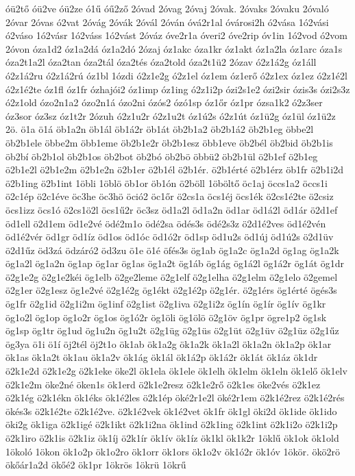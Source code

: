 {óü2tő
óü2ve
óü2ze
ó1ű
óű2ző
2óvad
2óvag
2óvaj
2óvak.
2óvaks
2óvaku
2óvaló
2óvar
2óvas
ó2vat
2óvág
2óvák
2óvál
2óván
óvá2r1al
óvárosi2h
ó2vása
1ó2vási
ó2váso
1ó2vásr
1ó2váss
1ó2vást
2óváz
óve2r1a
óveri2
óve2rip
óv1in
1ó2vod
ó2vom
2óvon
óza1d2
óz1a2dá
óz1a2dó
2ózaj
óz1akc
óza1kr
óz1akt
óz1a2la
óz1arc
óza1s
óza2t1a2l
óza2tan
óza2tál
óza2tés
óza2told
óza2t1ü2
2ózav
ó2z1á2g
óz1áll
ó2z1á2ru
ó2z1á2rú
óz1bl
1ózdi
ó2z1e2g
ó2z1el
óz1em
óz1erő
ó2z1ex
óz1ez
ó2z1é2l
ó2z1é2te
óz1fl
óz1fr
ózhajói2
óz1imp
óz1ing
ó2z1i2p
ózi2s1e2
ózi2sir
ózis3s
ózi2s3z
ó2z1old
ózo2n1a2
ózo2n1á
ózo2ni
ózós2
ózó1sp
óz1őr
óz1pr
ózsa1k2
ó2z3ser
óz3sor
óz3sz
óz1t2r
2ózuh
ó2z1u2r
ó2z1u2t
óz1ú2s
ó2z1út
óz1ü2g
óz1ül
óz1ü2z
2ö.
ö1a
ö1á
öb1a2n
öb1ál
öb1á2r
öb1át
öb2b1a2
öb2b1á2
öb2b1eg
öbbe2l
öb2b1ele
öbbe2m
öbb1eme
öb2b1e2r
öb2b1esz
öbb1eve
öb2bél
öb2bid
öb2b1is
öb2bí
öb2b1ol
öb2b1os
öb2bot
öb2bó
öb2bö
öbbü2
öb2b1ül
ö2b1ef
ö2b1eg
ö2b1e2l
ö2b1e2m
ö2b1e2n
ö2b1er
ö2b1él
ö2b1ér.
ö2b1érté
ö2b1érz
öb1fr
ö2b1i2d
ö2b1ing
ö2b1int
1öbli
1öblö
öb1or
öb1ón
ö2böll
1öböltő
öc1aj
öccs1a2
öccs1i
ö2c1ép
ö2c1éve
öc3he
öc3hö
öció2
öc1őr
ö2cs1a
öcs1éj
öcs1ék
ö2cs1é2te
ö2csiz
öcs1izz
öcs1ó
ö2cs1ö2l
öcs1ű2r
öc3sz
öd1a2l
öd1a2n
öd1ar
öd1á2l
öd1ár
ö2d1ef
öd1ell
ö2d1em
öd1e2vé
ödé2m1o
ödé2sa
ödés3s
ödé2s3z
ö2d1é2ves
öd1é2vén
öd1é2vér
öd1gr
öd1íz
öd1os
öd1óc
öd1ó2r
öd1sp
öd1u2s
öd1új
öd1ú2s
ö2d1üv
ö2d1űz
öd3zá
ödzáró2
öd3zu
ö1e
ö1é
öfés3s
ög1ab
ög1a2c
ög1a2d
ög1ag
ög1a2k
ög1a2l
ög1a2n
ög1ap
ög1ar
ög1as
ög1a2t
ög1áb
ög1ág
ög1á2l
ög1á2r
ög1át
ög1dr
ö2g1e2g
ö2g1e2kéi
ög1elb
ö2ge2leme
ö2g1elf
ö2g1elha
ö2g1elm
ö2g1elo
ö2gemel
ö2g1er
ö2g1esz
ög1e2vé
ö2g1é2g
ög1ékt
ö2g1é2p
ö2g1ér.
ö2g1érs
ög1érté
ögés3s
ög1fr
ö2g1id
ö2g1i2m
ög1inf
ö2g1ist
ö2g1iva
ö2g1i2z
ög1ín
ög1ír
ög1ív
ög1kr
ög1o2l
ög1op
ög1o2r
ög1os
ög1ó2r
ög1öli
ög1ölö
ö2g1öv
ög1pr
ögre1p2
ög1sk
ög1sp
ög1tr
ög1ud
ög1u2n
ög1u2t
ö2g1üg
ö2g1üs
ö2g1üt
ö2g1üv
ö2g1üz
ö2g1űz
ög3ya
ö1i
ö1í
öj2tél
öj2t1o
ök1ab
ök1a2g
ök1a2k
ök1a2l
ök1a2n
ök1a2p
ök1ar
ök1as
ök1a2t
ök1au
ök1a2v
ök1ág
ök1ál
ök1á2p
ök1á2r
ök1át
ök1áz
ök1dr
ö2k1e2d
ö2k1e2g
ö2k1eke
öke2l
ök1ela
ök1ele
ök1elh
ök1elm
ök1eln
ök1elő
ök1elv
ö2k1e2m
öke2né
öken1s
ök1erd
ö2k1e2resz
ö2k1e2rő
ö2k1es
öke2vés
ö2k1ez
ö2k1ég
ö2k1ékn
ök1éks
ök1é2les
ö2k1ép
öké2r1e2l
öké2r1em
ö2k1é2rez
ö2k1é2rés
ökés3s
ö2k1é2te
ö2k1é2ve.
ö2k1é2vek
ök1é2vet
ök1fr
ök1gl
öki2d
ök1ide
ök1ido
öki2g
ök1iga
ö2k1igé
ö2k1ikt
ö2k1i2na
ök1ind
ö2k1ing
ö2k1int
ö2k1i2o
ö2k1i2p
ö2k1iro
ö2k1is
ö2k1iz
ök1íj
ö2k1ír
ök1ív
ök1íz
ök1kl
ök1k2r
1öklű
ök1ok
ök1old
1ökoló
1ökon
ök1o2p
ök1o2ro
ök1orr
ök1ors
ök1o2v
ök1ó2r
ök1óv
1ökör.
ökö2rö
ökőár1a2d
ökőé2
ök1pr
1ökrös
1ökrü
1ökrű
}
